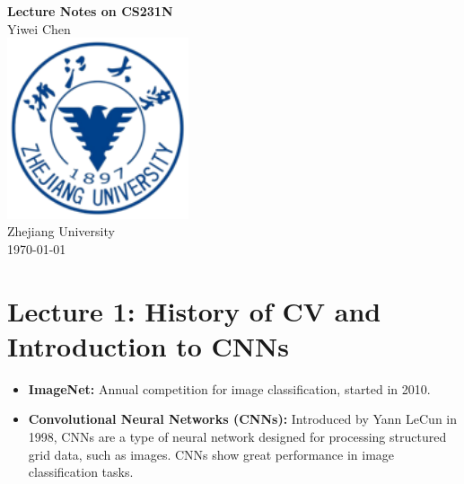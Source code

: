 \documentclass{article}
\numberwithin{equation}{section}
\begin{document}
\begin{CJK}{UTF8}{gbsn}
\begin{titlepage}
    \centering
    \vspace*{2cm}
    {\Huge \textbf{Lecture Notes on CS231N}}\\[1.5cm]
    {\Large Yiwei Chen}\\[0.5cm]
    \vfill
    \includegraphics[width=0.4\textwidth]{images/school_badge.png}\\[1cm] %
    {\large Zhejiang University}\\[1cm]
    {\large \today}
\end{titlepage}

\onehalfspacing %

\section*{Lecture 1: History of CV and Introduction to CNNs}
\setcounter{section}{1}
\setcounter{equation}{0}
\begin{itemize}
    \item \textbf{ImageNet:} Annual competition for image classification, started in 2010.
    \item \textbf{Convolutional Neural Networks (CNNs):} Introduced by Yann LeCun in 1998, CNNs are a type of neural network designed for processing structured grid data, such as images. CNNs show great performance in image classification tasks.
\end{itemize}

\newpage


\end{CJK}
\end{document}
